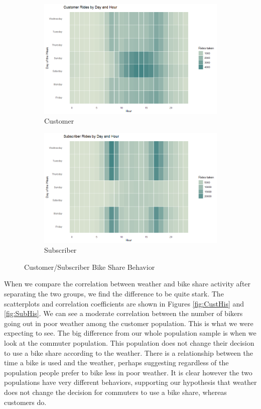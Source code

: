 \documentclass{report}
\begin{document}
\begin{figure}[h!]
	\begin{subfigure}[b]{0.5\linewidth}
		\includegraphics[width=\linewidth]{HeatmapCus.png}
		\caption{Customer}
	\end{subfigure}
	\begin{subfigure}[b]{0.5\linewidth}
		\includegraphics[width=\linewidth]{HeatmapSub.png}
		\caption{Subscriber}
	\end{subfigure}
	\caption{Customer/Subscriber Bike Share Behavior}
	\label{fig:SplitHeatmap}
\end{figure}

	When we compare the correlation between weather and bike share activity after separating the two groups, we find the difference to be quite stark. The scatterplots and correlation coefficients are shown in Figures \ref{fig:CustHis} and \ref{fig:SubHis}. We can see a moderate correlation between the number of bikers going out in poor weather among the customer population. This is what we were expecting to see. The big difference from our whole population sample is when we look at the commuter population. This population does not change their decision to use a bike share according to the weather. There is a relationship between the time a bike is used and the weather, perhaps suggesting regardless of the population people prefer to bike less in poor weather. It is clear however the two populations have very different behaviors, supporting our hypothesis that weather does not change the decision for commuters to use a bike share, whereas customers do.
\end{document}
